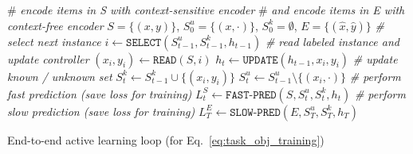 %
%
%

\begin{algorithm}[H]
\begin{algorithmic}[1]
\STATE \# \emph{encode items in S with context-sensitive encoder}
\STATE \# \emph{and encode items in E with context-free encoder}
\STATE $S = \{(x, y)\}$, $S_0^u = \{(x, \cdot)\}$, $S_0^k=\emptyset$, $E = \{(\hat x, \hat y)\}$
\STATE \emph{\# select next instance}
\STATE $i \gets \texttt{SELECT}(S_{t-1}^u, S_{t-1}^k, h_{t-1})$ 
\STATE \emph{\# read labeled instance and update controller}
\STATE $(x_{i}, y_{i}) \gets \texttt{READ}(S, i)$
\STATE $h_{t} \gets \texttt{UPDATE}(h_{t-1}, x_i, y_i)$
\STATE \emph{\# update known / unknown set}
\STATE $S_{t}^k \gets S_{t-1}^k \cup \{(x_i, y_i)\}$
\STATE $S_{t}^u \gets S_{t-1}^u \setminus \{(x_i, \cdot)\}$
\STATE \emph{\# perform fast prediction (save loss for training)}
\STATE $L_{t}^S \gets \texttt{FAST-PRED}(S, S_{t}^u, S_{t}^k, h_{t})$
\ENDFOR
\STATE \emph{\# perform slow prediction (save loss for training)}
\STATE $L_T^E \gets \texttt{SLOW-PRED}(E, S_{T}^u, S_{T}^k, h_T)$
\end{algorithmic}
\caption{End-to-end active learning loop (for Eq.~\ref{eq:task_obj_training})}
\label{alg:al_loop}
\end{algorithm}